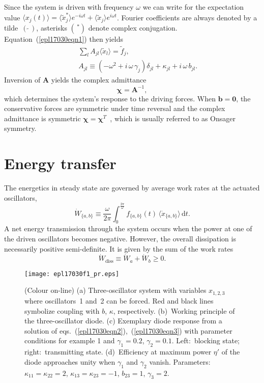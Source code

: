 \documentclass[doublecol,final,edchoice]{epl2}
\begin{document}
Since the system is driven with frequency $\omega$ we can write for the expectation value $\langle x_j(t)\rangle= \langle\tilde{x}^{*}_j\rangle e^{-i \omega t}+\langle\tilde{x}^{}_j\rangle e^{i \omega t}$. Fourier coefficients are always denoted by a tilde~$(\,\tilde{}\,)$, asterisks $(\,^{*})$ denote complex conjugation. Equation~(\ref{epl17030eqn1}) then yields
\begin{eqnarray}%
&&\sum_l A_{jl} \langle\tilde{x}_l\rangle = \tilde{f}_j,\label{epl17030eqn3}\\
&&A_{jl} \equiv (-\omega^2+ i\,\omega\, \gamma_j )\delta_{jl}+\kappa_{jl}+i\,\omega\,b_{jl}.
\label{epl17030eqn4}
\end{eqnarray}
Inversion of $\mathbf{A}$ yields the complex admittance
\begin{equation}%
\bm{\chi} =\mathbf{A}^{-1},
\label{epl17030eqn5}
\end{equation}
which determines the system's response to the driving forces. When $\mathbf{b} = \mathbf{0}$, the conservative forces are symmetric under time reversal and the complex admittance is symmetric $\bm{\chi} = \bm{\chi}^{T}$~\cite{epl17030bib15}, which is usually referred to as Onsager symmetry.

\section{Energy transfer}

The energetics in steady state are governed by average work rates at the actuated oscillators,
\begin{equation}%
\dot{W}_{\{a,b\}} \equiv \frac{\omega}{2 \pi}\int_0^{\frac{2 \pi}{\omega}} f_{\{a,b\}}(t)\,\langle\dot{x}_{\{a,b\}}\rangle \,\mathrm{d} t.
\label{epl17030eqn6}
\end{equation}
A net energy transmission through the system occurs when the power at one of the driven oscillators becomes negative. However, the overall dissipation is necessarily positive semi-definite. It is given by the sum of the work rates
\begin{equation}%
\dot{W}_{\text{diss}} \equiv \dot{W}_a+\dot{W}_b \geq 0.
\label{epl17030eqn7}
\end{equation}

\begin{figure}%
\centering
\texttt{[image: epl17030f1\_pr.eps]}
\caption{(Colour on-line) (a) Three-oscillator system with variables $x_{1,2,3}$ where oscillators~1 and~2 can be forced. Red and black lines symbolize coupling with $b$, $\kappa$, respectively. (b)~Working principle of the three-oscillator diode. (c) Exemplary diode response from a solution of eqs.~(\ref{epl17030eqn2}),~(\ref{epl17030eqn3}) with parameter conditions for example 1 and $\gamma_1=0.2$, $\gamma_2=0.1$. Left:~blocking state; right:~transmitting state. (d)~Efficiency at maximum power $\eta'$ of the diode approaches unity when $\gamma_1$ and $\gamma_2$ vanish. Parameters:~$\kappa_{11}=\kappa_{22}=2$, $\kappa_{13}=\kappa_{23}=-1$, $b_{23}=1$, $\gamma_3 =2$.}
\label{epl17030fig1}
\vspace*{-10pt}
\end{figure}
\end{document}
